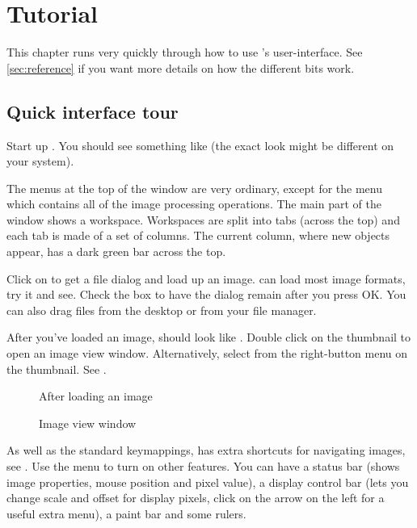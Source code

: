 \chapter{Tutorial}

This chapter runs very quickly through how to use \nip{}'s user-interface. See
\cref{sec:reference} if you want more details on how the different bits work.

\section{Quick interface tour}

Start up \nip{}. You should see something like  (the
exact look might be different on your system).

The menus at the top of the window are very ordinary, except for the
 menu which contains all of the image processing operations.
The main part of the window shows a workspace. Workspaces are split into tabs
(across the top) and each tab is made of a set of columns. The current column,
where new objects appear, has a dark green bar across the top. 

Click on  to get a file dialog and load up an
image. \nip{} can load most image formats, try it and see.  Check the
 box to have the dialog remain after you press OK. 
You can also drag files from the desktop or from your file manager.

After you've loaded an image, \nip{} should look like .
Double click on the thumbnail to open an image view window. Alternatively,
select  from the right-button menu on the thumbnail. See
.

\begin{figure}
\caption{After loading an image}
\end{figure}

\begin{figure}
\caption{Image view window}
\end{figure}

As well as the standard keymappings, \nip{} has extra shortcuts for
navigating images, see .  Use the 
menu to turn on other features. You can have a status bar (shows image
properties, mouse position and pixel value), a display control bar (lets
you change scale and offset for display pixels, click on the arrow on the
left for a useful extra menu), a paint bar and some rulers.


